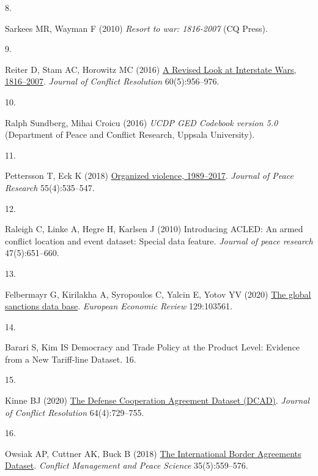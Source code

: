 \documentclass[9pt,twocolumn,twoside,lineno]{pnas-new}
\newlength{\cslhangindent}
\newlength{\csllabelwidth}
\newlength{\cslentryspacingunit} %
\newenvironment{CSLReferences}[2] %
 {%
  \setlength{\parindent}{0pt}
  \ifodd #1
  \let\oldpar\par
  \def\par{\hangindent=\cslhangindent\oldpar}
  \fi
  \setlength{\parskip}{#2\cslentryspacingunit}
 }%
 {}
\newcommand{\CSLLeftMargin}[1]{\parbox[t]{\csllabelwidth}{#1}}
\newcommand{\CSLRightInline}[1]{\parbox[t]{\linewidth - \csllabelwidth}{#1}\break}
\begin{document}
\begin{CSLReferences}{0}{0}
\leavevmode{}%
\CSLLeftMargin{8. }%
\CSLRightInline{Sarkees MR, Wayman F (2010) \emph{Resort to war:
1816-2007} ({CQ Press}).}

\leavevmode{}%
\CSLLeftMargin{9. }%
\CSLRightInline{Reiter D, Stam AC, Horowitz MC (2016)
\href{https://doi.org/10.1177/0022002714553107}{A {Revised Look} at
{Interstate Wars}, 1816--2007}. \emph{Journal of Conflict Resolution}
60(5):956--976.}

\leavevmode{}%
\CSLLeftMargin{10. }%
\CSLRightInline{Ralph Sundberg, Mihai Croicu (2016) \emph{{UCDP GED
Codebook} version 5.0} ({Department of Peace and Conflict Research,
Uppsala University}).}

\leavevmode{}%
\CSLLeftMargin{11. }%
\CSLRightInline{Pettersson T, Eck K (2018)
\href{https://doi.org/10.1177/0022343318784101}{Organized violence,
1989--2017}. \emph{Journal of Peace Research} 55(4):535--547.}

\leavevmode{}%
\CSLLeftMargin{12. }%
\CSLRightInline{Raleigh C, Linke A, Hegre H, Karlsen J (2010)
Introducing {ACLED}: An armed conflict location and event dataset:
Special data feature. \emph{Journal of peace research} 47(5):651--660.}

\leavevmode{}%
\CSLLeftMargin{13. }%
\CSLRightInline{Felbermayr G, Kirilakha A, Syropoulos C, Yalcin E, Yotov
YV (2020) \href{https://doi.org/10.1016/j.euroecorev.2020.103561}{The
global sanctions data base}. \emph{European Economic Review}
129:103561.}

\leavevmode{}%
\CSLLeftMargin{14. }%
\CSLRightInline{Barari S, Kim IS Democracy and {Trade Policy} at the
{Product Level}: {Evidence} from a {New Tariff-line Dataset}. 16.}

\leavevmode{}%
\CSLLeftMargin{15. }%
\CSLRightInline{Kinne BJ (2020)
\href{https://doi.org/10.1177/0022002719857796}{The {Defense Cooperation
Agreement Dataset} ({DCAD})}. \emph{Journal of Conflict Resolution}
64(4):729--755.}

\leavevmode{}%
\CSLLeftMargin{16. }%
\CSLRightInline{Owsiak AP, Cuttner AK, Buck B (2018)
\href{https://doi.org/10.1177/0738894216646978}{The {International
Border Agreements Dataset}}. \emph{Conflict Management and Peace
Science} 35(5):559--576.}


\end{CSLReferences}
\end{document}
